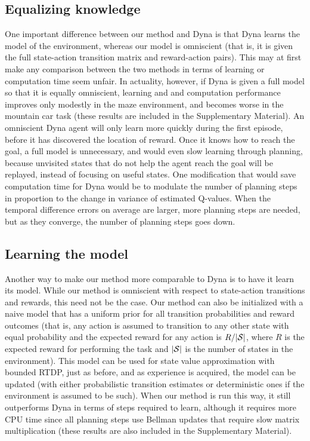 \documentclass[letterpaper]{article}
\begin{document}
\subsection{Equalizing knowledge}

One important difference between our method and Dyna is that Dyna learns the model of the environment, whereas our model is omniscient (that is, it is given the full state-action transition matrix and reward-action pairs). This may at first make any comparison between the two methods in terms of learning or computation time seem unfair. In actuality, however, if Dyna is given a full model so that it is equally omniscient, learning and and computation performance improves only modestly in the maze environment, and becomes worse in the mountain car task (these results are included in the Supplementary Material). An omniscient Dyna agent will only learn more quickly during the first episode, before it has discovered the location of reward. Once it knows how to reach the goal, a full model is unnecessary, and would even slow learning through planning, because unvisited states that do not help the agent reach the goal will be replayed, instead of focusing on useful states. One modification that would save computation time for Dyna would be to modulate the number of planning steps in proportion to the change in variance of estimated Q-values. When the temporal difference errors on average are larger, more planning steps are needed, but as they converge, the number of planning steps goes down.

\subsection{Learning the model}

Another way to make our method more comparable to Dyna is to have it learn its model. While our method is omniscient with respect to state-action transitions and rewards, this need not be the case. Our method can also be initialized with a naive model that has a uniform prior for all transition probabilities and reward outcomes (that is, any action is assumed to transition to any other state with equal probability and the expected reward for any action is $R/|{\cal S}|$, where $R$ is the expected reward for performing the task and $|{\cal S}|$ is the number of states in the environment). This model can be used for state value approximation with bounded RTDP, just as before, and as experience is acquired, the model can be updated (with either probabilistic transition estimates or deterministic ones if the environment is assumed to be such). When our method is run this way, it still outperforms Dyna in terms of steps required to learn, although it requires more CPU time since all planning steps use Bellman updates that require slow matrix multiplication (these results are also included in the Supplementary Material).
\end{document}

